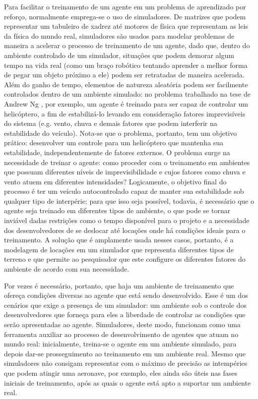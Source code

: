 \documentclass[cic,tc]{iiufrgs}
\begin{document}
Para facilitar o treinamento de um agente em um problema de aprendizado por
reforço, normalmente emprega-se o uso de simuladores. De matrizes que podem
representar um tabuleiro de xadrez até motores de física que representam as
leis da física do mundo real, simuladores são usados para modelar problemas de
maneira a acelerar o processo de treinamento de um agente, dado que, dentro do
ambiente controlado de um simulador, situações que podem demorar algum tempo na
vida real (como um braço robótico tentando aprender a melhor forma de pegar um
objeto próximo a ele) podem ser retratadas de maneira acelerada. Além do ganho
de tempo, elementos de natureza aleatória podem ser facilmente controlados
dentro de um ambiente simulado: no problema trabalhado na tese de Andrew Ng
\cite{Ng2003}, por exemplo, um agente é treinado para ser capaz de
controlar um helicóptero, a fim de estabilizá-lo levando em consideração fatores
imprevisíveis do sistema (e.g. vento, chuva e demais fatores que podem
interferir na estabilidade do veículo). Nota-se que o problema, portanto, tem um
objetivo prático: desenvolver um controle para um helicóptero que mantenha sua
estabilidade, independentemente de fatores externos. O problema surge na
necessidade de treinar o agente: como proceder com o treinamento em ambientes
que possuam diferentes níveis de imprevisibilidade e cujos fatores como chuva
e vento atuem em diferentes intensidades? Logicamente, o objetivo final do
processo é ter um veículo autocontrolado capaz de manter sua estabilidade sob
qualquer tipo de interpérie; para que isso seja possível, todavia, é necessário
que o agente seja treinado em diferentes tipos de ambiente, o que pode se tornar
inviável dadas restrições como o tempo disponível para o projeto e a necessidade dos
desenvolvedores de se deslocar até locações onde há condições ideais para o
treinamento. A solução que é amplamente usada nesses casos, portanto, é a
modelagem de locações em um simulador que representa diferentes tipos de terreno
e que permite ao pesquisador que este configure os diferentes
fatores do ambiente de acordo com sua necessidade.

Por vezes é necessário, portanto, que haja um ambiente de treinamento que ofereça
condições diversas ao agente que está sendo desenvolvido. Esse é um dos cenários
que exige a presença de um simulador: um ambiente sob o controle dos
desenvolvedores que forneça para eles a liberdade de controlar as condições que
serão apresentadas ao agente. Simuladores, deste modo, funcionam como uma
ferramenta auxiliar ao processo de desenvolvimento de agentes que atuam no mundo
real: inicialmente, treina-se o agente
em um ambiente simulado, para depois dar-se prosseguimento ao treinamento em um
ambiente
real. Mesmo que simuladores não consigam representar com o máximo de precisão
as intempéries que podem atingir uma aeronave, por exemplo, eles ainda são úteis
nas fases iniciais de treinamento, após as quais o agente está apto a suportar
um ambiente real.
\end{document}
